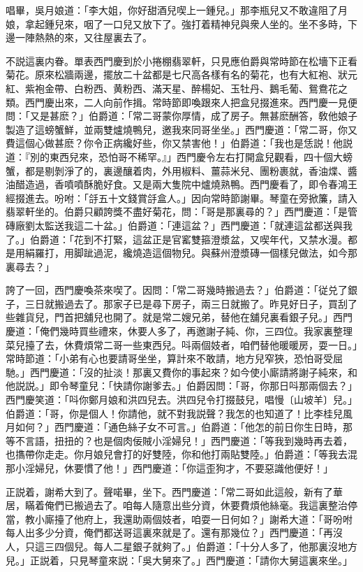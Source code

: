 唱畢，吳月娘道：「李大姐，你好甜酒兒喫上一鍾兒。」那李瓶兒又不敢違阻了月娘，拿起鍾兒來，咽了一口兒又放下了。強打着精神兒與衆人坐的。坐不多時，下邊一陣熱熱的來，又往屋裏去了。

不説這裏内眷。單表西門慶到於小捲棚翡翠軒，只見應伯爵與常時節在松墻下正看菊花。原來松牆兩邊，擺放二十盆都是七尺高各樣有名的菊花，也有大紅袍、狀元紅、紫袍金帶、白粉西、黄粉西、滿天星、醉楊妃、玉牡丹、鵝毛葡、鴛鴦花之類。西門慶出來，二人向前作揖。常時節即喚跟來人把盒兒掇進來。西門慶一見便問：「又是甚麽？」伯爵道：「常二哥蒙你厚情，成了房子。無甚麽酬答，敎他娘子製造了這螃蟹鮮，並兩雙爐燒鴨兒，邀我來同哥坐坐。」西門慶道：「常二哥，你又費這個心做甚麽？你令正病纔好些，你又禁害他！」伯爵道：「我也是恁説！他説道：『別的東西兒來，恐怕哥不稀罕。』」西門慶令左右打開盒兒觀看，四十個大螃蟹，都是剔剝淨了的，裏邊釀着肉，外用椒料、薑蒜米兒、團粉裹就，香油煠、醬油醋造過，香噴噴酥脆好食。又是兩大隻院中爐燒熟鴨。西門慶看了，即令春鴻王經掇進去。吩咐：「㧱五十文錢賞㧱盒人。」因向常時節謝畢。琴童在旁掀簾，請入翡翠軒坐的。伯爵只顧誇獎不盡好菊花，問：「哥是那裏尋的？」西門慶道：「是管磚廠劉太監送我這二十盆。」伯爵道：「連這盆？」西門慶道：「就連這盆都送與我了。」伯爵道：「花到不打緊，這盆正是官窰雙箍澄漿盆，又喫年代，又禁水漫。都是用絹羅打，用脚跐過泥，纔燒造這個物兒。與蘇州澄漿磚一個樣兒做法，如今那裏尋去？」

誇了一回，西門慶喚茶來喫了。因問：「常二哥幾時搬過去？」伯爵道：「従兑了銀子，三日就搬過去了。那家子已是尋下房子，兩三日就搬了。昨見好日子，買刮了些雜貨兒，門首把舖兒也開了。就是常二嫂兄弟，替他在舖兒裏看銀子兒。」西門慶道：「俺們幾時買些禮來，休要人多了，再邀謝子純、你，三四位。我家裏整理菜兒擡了去，休費煩常二哥一些東西兒。呌兩個妓者，咱們替他暖暖房，耍一日。」常時節道：「小弟有心也要請哥坐坐，算計來不敢請，地方兒窄狹，恐怕哥受屈馳。」西門慶道：「沒的扯淡！那裏又費你的事起來？如今使小廝請將謝子純來，和他説説。」即令琴童兒：「快請你謝爹去。」伯爵因問：「哥，你那日呌那兩個去？」西門慶笑道：「呌你鄭月娘和洪四兒去。洪四兒令打掇鼓兒，唱慢〔山坡羊〕兒。」伯爵道：「哥，你是個人！你請他，就不對我説聲？我怎的也知道了！比李桂兒風月如何？」西門慶道：「通色絲子女不可言。」伯爵道：「他怎的前日你生日時，那等不言語，扭扭的？也是個肉佞賊小淫婦兒！」西門慶道：「等我到幾時再去着，也㩦帶你走走。你月娘兒會打的好雙陸，你和他打兩貼雙陸。」伯爵道：「等我去混那小淫婦兒，休要慣了他！」西門慶道：「你這歪狗才，不要惡識他便好！」

正説着，謝希大到了。聲喏畢，坐下。西門慶道：「常二哥如此這般，新有了華居，瞞着俺們已搬過去了。咱每人隨意出些分資，休要費煩他絲毫。我這裏整治停當，教小廝擡了他府上，我還助兩個妓者，咱耍一日何如？」謝希大道：「哥吩咐每人出多少分資，俺們都送哥這裏來就是了。還有那幾位？」西門慶道：「再沒人，只這三四個兒。每人二星銀子就夠了。」伯爵道：「十分人多了，他那裏沒地方兒。」正説着，只見琴童來説：「吳大舅來了。」西門慶道：「請你大舅這裏來坐。」

